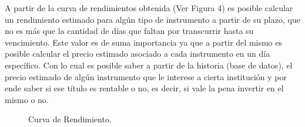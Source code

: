 \vspace{0.5cm}

\hspace{0.4cm} A partir de la curva de rendimientos obtenida (Ver Figura 4) es posible calcular un rendimiento estimado para alg\'un tipo de instrumento a partir de su plazo, que no es m\'as que la cantidad de d\'ias que faltan por transcurrir hasta su vencimiento. Este valor es de suma importancia ya que a partir del mismo es posible calcular el precio estimado asociado a cada instrumento en un d\'ia espec\'ifico. Con lo cual es posible saber a partir de la historia (base de datos), el precio estimado de alg\'un instrumento que le interese a cierta instituci\'on y por ende saber si ese t\'itulo es rentable o no, es decir, si vale la pena invertir en el mismo o no.\\

\begin{figure}[h]
\caption{Curva de Rendimiento.}
\end{figure}



